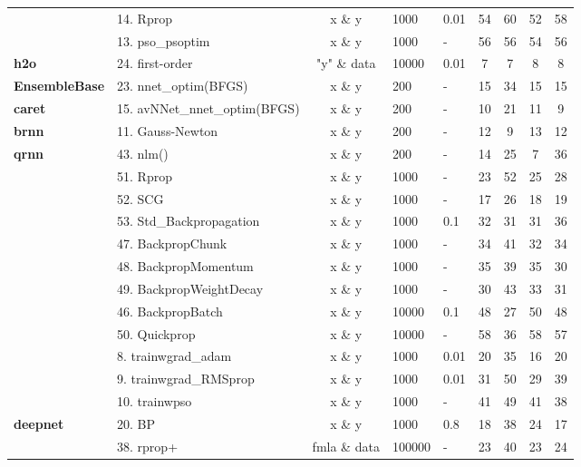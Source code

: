 \begin{Schunk}
\begin{table}
\begin{tabular}[t]{>{\bfseries}llcllcccc}
 & 14. Rprop & x \& y & 1000 & 0.01 & 54 & 60 & 52 & 58\\

\multirow{-3}{*}{\raggedright\arraybackslash CaDENCE} & 13. pso\_psoptim & x \& y & 1000 & - & 56 & 56 & 54 & 56\\
\cmidrule{1-9}
h2o & 24. first-order & "y" \& data & 10000 & 0.01 & 7 & 7 & 8 & 8\\
\cmidrule{1-9}
EnsembleBase & 23. nnet\_optim(BFGS) & x \& y & 200 & - & 15 & 34 & 15 & 15\\
\cmidrule{1-9}
caret & 15. avNNet\_nnet\_optim(BFGS) & x \& y & 200 & - & 10 & 21 & 11 & 9\\
\cmidrule{1-9}
brnn & 11. Gauss-Newton & x \& y & 200 & - & 12 & 9 & 13 & 12\\
\cmidrule{1-9}
qrnn & 43. nlm() & x \& y & 200 & - & 14 & 25 & 7 & 36\\
\cmidrule{1-9}
 & 51. Rprop & x \& y & 1000 & - & 23 & 52 & 25 & 28\\

 & 52. SCG & x \& y & 1000 & - & 17 & 26 & 18 & 19\\

 & 53. Std\_Backpropagation & x \& y & 1000 & 0.1 & 32 & 31 & 31 & 36\\

 & 47. BackpropChunk & x \& y & 1000 & - & 34 & 41 & 32 & 34\\

 & 48. BackpropMomentum & x \& y & 1000 & - & 35 & 39 & 35 & 30\\

 & 49. BackpropWeightDecay & x \& y & 1000 & - & 30 & 43 & 33 & 31\\

 & 46. BackpropBatch & x \& y & 10000 & 0.1 & 48 & 27 & 50 & 48\\

\multirow{-8}{*}{\raggedright\arraybackslash RSNNS} & 50. Quickprop & x \& y & 10000 & - & 58 & 36 & 58 & 57\\
\cmidrule{1-9}
 & 8. trainwgrad\_adam & x \& y & 1000 & 0.01 & 20 & 35 & 16 & 20\\

 & 9. trainwgrad\_RMSprop & x \& y & 1000 & 0.01 & 31 & 50 & 29 & 39\\

\multirow{-3}{*}{\raggedright\arraybackslash automl} & 10. trainwpso & x \& y & 1000 & - & 41 & 49 & 41 & 38\\
\cmidrule{1-9}
deepnet & 20. BP & x \& y & 1000 & 0.8 & 18 & 38 & 24 & 17\\
\cmidrule{1-9}
 & 38. rprop+ & fmla \& data & 100000 & - & 23 & 40 & 23 & 24\\


\end{tabular}
\end{table}
\end{Schunk}
